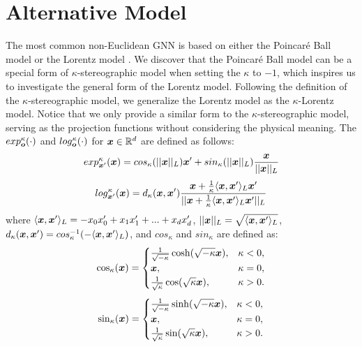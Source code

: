 \section{Alternative Model}
\label{subsec:alternative}

The most common non-Euclidean GNN is based on either the Poincaré Ball model \citep{hgnn19liu} or the Lorentz model \citep{lorentz18nickle}. We discover that the Poincaré Ball model can be a special form of $\kappa$-stereographic model when setting the $\kappa$ to $-1$, which inspires us to investigate the general form of the Lorentz model. Following the definition of the $\kappa$-stereographic model, we generalize the Lorentz model as the $\kappa$-Lorentz model. Notice that we only provide a similar form to the $\kappa$-stereographic model, serving as the projection functions without considering the physical meaning. The $exp_{\boldsymbol{o}}^\kappa(\cdot)$ and $log_{\boldsymbol{o}}^\kappa(\cdot)$ for $\boldsymbol{x}\in \mathbb{R}^d$ are defined as follows: 
\begin{equation*}
exp_{\boldsymbol{x}'}^\kappa(\boldsymbol{x})=cos_\kappa(||\boldsymbol{x}||_L)\boldsymbol{x}'+sin_\kappa(||\boldsymbol{x}||_L)\frac{\boldsymbol{x}}{||\boldsymbol{x}||_L}
\end{equation*}
\begin{equation*}
log_{\boldsymbol{x}'}^\kappa(\boldsymbol{x})=d_\kappa(\boldsymbol{x}, \boldsymbol{x}')\frac{\boldsymbol{x}+\frac{1}{\kappa}\langle\boldsymbol{x}, \boldsymbol{x}'\rangle_L\boldsymbol{x}'}{||\boldsymbol{x}+\frac{1}{\kappa}\langle\boldsymbol{x}, \boldsymbol{x}'\rangle_L\boldsymbol{x}'||_L}
\end{equation*}
where $\langle\boldsymbol{x}, \boldsymbol{x}'\rangle_L=-x_0x_0'+x_1x_1'+...+x_dx_d'$, $||\boldsymbol{x}||_L=\sqrt{\langle\boldsymbol{x}, \boldsymbol{x}'\rangle_L}$, $d_\kappa(\boldsymbol{x}, \boldsymbol{x}')=cos_\kappa^{-1}(-\langle\boldsymbol{x}, \boldsymbol{x}'\rangle_L)$, and $cos_\kappa$ and $sin_\kappa$ are defined as: 
\begin{equation*}
\begin{aligned}
    \cos_\kappa(\boldsymbol{x})=
    \begin{cases}
    \frac{1}{\sqrt{-\kappa}}\cosh(\sqrt{-\kappa}\boldsymbol{x}), &\kappa < 0,\\
    \boldsymbol{x}, &\kappa=0,\\
    \frac{1}{\sqrt{\kappa}}\cos(\sqrt{\kappa}\boldsymbol{x}), &\kappa>0. 
    \end{cases}
\end{aligned}
\end{equation*}
\begin{equation*}
\begin{aligned}
    \sin_\kappa(\boldsymbol{x})=
    \begin{cases}
    \frac{1}{\sqrt{-\kappa}}\sinh(\sqrt{-\kappa}\boldsymbol{x}), &\kappa < 0,\\
    \boldsymbol{x}, &\kappa=0,\\
    \frac{1}{\sqrt{\kappa}}\sin(\sqrt{\kappa}\boldsymbol{x}), &\kappa>0. 
    \end{cases}
\end{aligned}
\end{equation*}
